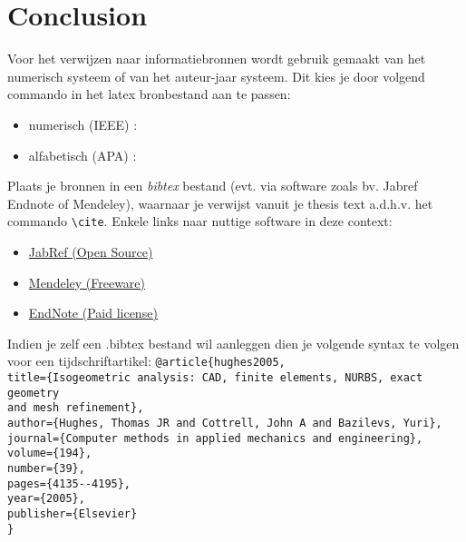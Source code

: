 \chapter{Conclusion}



Voor het verwijzen naar informatiebronnen wordt gebruik gemaakt van het numerisch systeem  of van het auteur-jaar systeem. Dit kies je door volgend commando in het latex bronbestand aan te passen:

\begin{itemize}
	\item numerisch (IEEE) : \verb||
	\item alfabetisch (APA) : \verb||
\end{itemize}

Plaats je bronnen in een \textit{bibtex} bestand (evt. via software zoals bv. Jabref Endnote of Mendeley), waarnaar je verwijst vanuit je thesis text a.d.h.v. het commando \verb|\cite|. Enkele links naar nuttige software in deze context:

\begin{itemize}
	\item \href{http://www.jabref.org/}{JabRef (Open Source)}
	\item \href{http://www.mendeley.com}{Mendeley (Freeware)}
	\item \href{http://www.endnote.com}{EndNote (Paid license)}
\end{itemize}

Indien je zelf een .bibtex bestand wil aanleggen dien je volgende syntax te volgen voor een tijdschriftartikel:
\clearpage
\verb|@article{hughes2005,|\\
\verb|title={Isogeometric analysis: CAD, finite elements, NURBS, exact geometry|\\ \verb|and mesh refinement},|\\
\verb|author={Hughes, Thomas JR and Cottrell, John A and Bazilevs, Yuri},|\\
\verb|journal={Computer methods in applied mechanics and engineering},|\\
\verb|volume={194},|\\
\verb|number={39},|\\
\verb|pages={4135--4195},|\\
\verb|year={2005},|\\
\verb|publisher={Elsevier}|\\
\verb|}|

